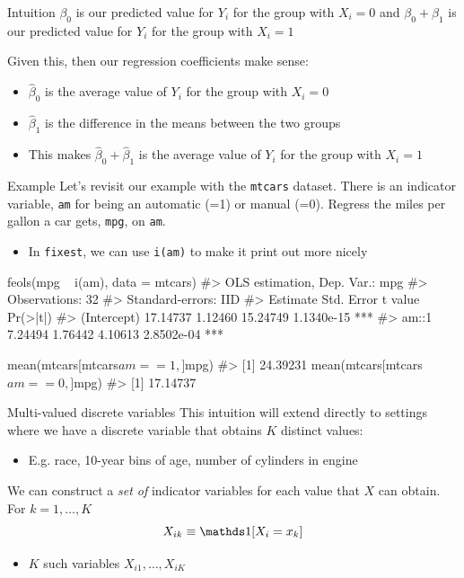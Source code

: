 \documentclass[aspectratio=169,t,11pt,table]{beamer}
\begin{document}
\begin{frame}{Intuition}
  $\beta_0$ is our predicted value for $Y_i$ for the group with $X_i = 0$ and $\beta_0 + \beta_1$ is our predicted value for $Y_i$ for the group with $X_i = 1$ 

  \bigskip
  Given this, then our regression coefficients make sense:
  \begin{itemize}
    \item $\hat{\beta}_0$ is the average value of $Y_i$ for the group with $X_i = 0$
    
    \item $\hat{\beta}_1$ is the difference in the means between the two groups
    
    \item This makes $\hat{\beta}_0 + \hat{\beta}_1$ is the average value of $Y_i$ for the group with $X_i = 1$
  \end{itemize}
\end{frame}

\begin{frame}{Example}
  Let's revisit our example with the \texttt{mtcars} dataset. There is an indicator variable, \texttt{am} for being an automatic (=1) or manual (=0). 
  Regress the miles per gallon a car gets, \texttt{mpg}, on \texttt{am}.

  \begin{itemize}
    \item In \texttt{fixest}, we can use \texttt{i(am)} to make it print out more nicely
  \end{itemize}
\end{frame}
 
\begin{frame}[fragile]{}
  \begin{codeblock}
feols(mpg ~ i(am), data = mtcars)
#> OLS estimation, Dep. Var.: mpg
#> Observations: 32
#> Standard-errors: IID 
#>             Estimate Std. Error  t value   Pr(>|t|)    
#> (Intercept) 17.14737    1.12460 15.24749 1.1340e-15 ***
#> am::1        7.24494    1.76442  4.10613 2.8502e-04 ***

mean(mtcars[mtcars$am == 1, ]$mpg)
#> [1] 24.39231
mean(mtcars[mtcars$am == 0, ]$mpg)
#> [1] 17.14737
  \end{codeblock}
\end{frame}


\begin{frame}{Multi-valued discrete variables}
  This intuition will extend directly to settings where we have a discrete variable that obtains $K$ distinct values:
  \begin{itemize}
    \item E.g. race, 10-year bins of age, number of cylinders in engine
  \end{itemize}

  \pause
  \bigskip
  We can construct a \emph{set of} indicator variables for each value that $X$ can obtain. For $k = 1, \dots, K$
  $$
    X_{ik} \equiv \one{X_i = x_k}
  $$
  \begin{itemize}
    \item $K$ such variables $X_{i1}, \dots, X_{iK}$
  \end{itemize}
\end{frame}
\end{document}
